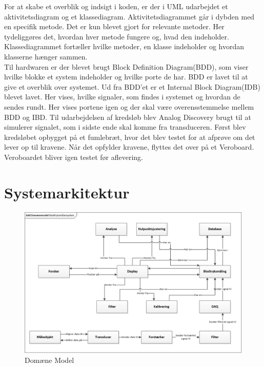 \newline 
For at skabe et overblik og indsigt i koden, er der i UML udarbejdet et aktivitetsdiagram og et klassediagram. Aktivitetsdiagrammet går i dybden med en specifik metode. Det er kun blevet gjort for relevante metoder. Her tydeliggøres det, hvordan hver metode fungere og, hvad den indeholder.  Klassediagrammet fortæller hvilke metoder, en klasse indeholder og hvordan klasserne hænger sammen.\\
\newline  
Til hardwaren er der blevet brugt Block Definition Diagram(BDD), som viser hvilke blokke et system indeholder og hvilke porte de har. BDD er lavet til at give et overblik over systemet. Ud fra BDD’et er et Internal Block Diagram(IDB) blevet lavet. Her vises, hvilke signaler, som findes i systemet og hvordan de sendes rundt. Her vises portene igen og der skal være overensstemmelse mellem BDD og IBD.    
\newline 
Til udarbejdelsen af kredsløb blev Analog Discovery brugt til at simulerer signalet, som i sidste ende skal komme fra transduceren. Først blev kredsløbet opbygget på et fumlebræt, hvor det blev testet for at afprøve om det lever op til kravene. Når det opfylder kravene, flyttes det over på et Veroboard. Veroboardet bliver igen testet før aflevering. 

\section{Systemarkitektur}

\begin{figure}[H]
	\centering
	\includegraphics[width=1.0\textwidth]{Figurer/DomaneModel}
	\caption{Domæne Model}
	\label{fig:Domaene Model}
\end{figure}

